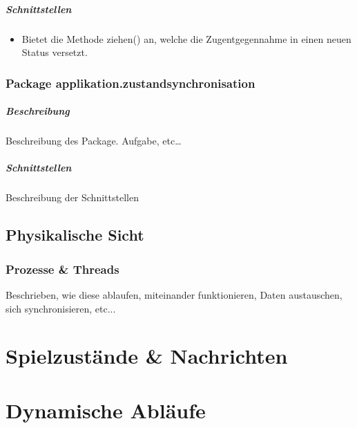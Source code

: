 \documentclass[12pt,halfparskip]{scrartcl}
\begin{document}
\subparagraph{Schnittstellen} %
\label{ssub:schnittstellen}
\begin{itemize}
	\item Bietet die Methode ziehen() an, welche die Zugentgegennahme in einen neuen Status versetzt.
\end{itemize}

\clearpage
\subsubsection{Package applikation.zustandsynchronisation} %
\label{ssub:package_app_zustandsynchronisation}
\subparagraph{Beschreibung}
Beschreibung des Package. Aufgabe, etc…

\subparagraph{Schnittstellen} %
\label{ssub:schnittstellen}
Beschreibung der Schnittstellen


\clearpage
\subsection{Physikalische Sicht}

\subsubsection{Prozesse \& Threads} %
\label{sub:prozesse_threads}
Beschrieben, wie diese ablaufen, miteinander funktionieren, Daten austauschen, sich synchronisieren, etc...


\clearpage
\section{Spielzustände \& Nachrichten} %
\label{spielzustaende_nachrichten}

\clearpage
\section{Dynamische Abläufe} %
\label{dynamische_ablauefe}
\end{document}
